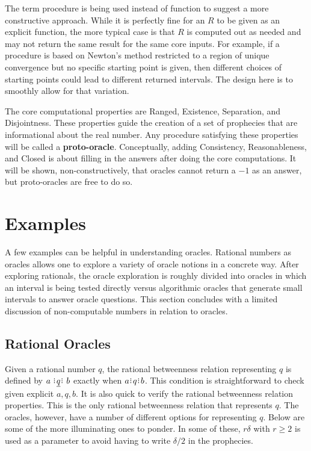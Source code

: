 \documentclass[12pt]{article}
\begin{document}
The term procedure is being used instead of function to suggest a more constructive approach. While it is perfectly fine for an $R$ to be given as an explicit function, the more typical case is that $R$ is computed out as needed and may not return the same result for the same core inputs. For example, if a procedure is based on Newton's method restricted to a region of unique convergence but no specific starting point is given, then different choices of starting points could lead to different returned intervals. The design here is to smoothly allow for that variation. 

The core computational properties are Ranged, Existence, Separation, and Disjointness. These properties guide the creation of a set of prophecies that are informational about the real number. Any procedure satisfying these properties will be called a \textbf{proto-oracle}. Conceptually, adding Consistency, Reasonableness, and Closed is about filling in the answers after doing the core computations. It will be shown, non-constructively, that oracles cannot return a $-1$ as an answer, but proto-oracles are free to do so. 


\section{Examples}

A few examples can be helpful in understanding oracles. Rational numbers as oracles allows one to explore a variety of oracle notions in a concrete way. After exploring rationals, the oracle exploration is roughly divided into oracles in which an interval is being tested directly versus algorithmic oracles that generate small intervals to answer oracle questions. This section concludes with a limited discussion of non-computable numbers in relation to oracles. 

\subsection{Rational Oracles}

Given a rational number $q$, the rational betweenness relation representing $q$ is defined by $a \xrel[q] b$ exactly when $a \rint q \rint b$. This condition is straightforward to check given explicit $a, q, b$. It is also quick to verify the rational betweenness relation properties. This is the only rational betweenness relation that represents $q$. The oracles, however, have a number of different options for representing $q$. Below are some of the more illuminating ones to ponder. In some of these, $r \delta$ with $r \geq 2$ is used as a parameter to avoid having to write $\delta/2$ in the prophecies. 
\end{document}
